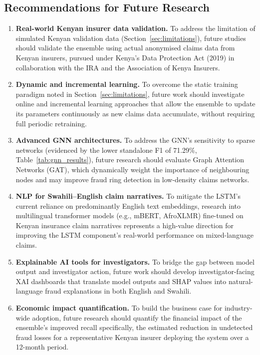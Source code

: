 \documentclass[12pt,a4paper,oneside]{report}
\numberwithin{equation}{chapter}
\begin{document}
\subsection{Recommendations for Future Research}
\label{sec:future-research}

\begin{enumerate}[leftmargin=*, label=\textbf{\arabic*.}]

  \item \textbf{Real-world Kenyan insurer data validation.}
  To address the limitation of simulated Kenyan validation data (Section~\ref{sec:limitations}),
  future studies should validate the ensemble using actual anonymised claims data from Kenyan
  insurers, pursued under Kenya's Data Protection Act (2019) in collaboration with the IRA and
  the Association of Kenya Insurers.

  \item \textbf{Dynamic and incremental learning.}
  To overcome the static training paradigm noted in Section~\ref{sec:limitations}, future work
  should investigate online and incremental learning approaches that allow the ensemble to update
  its parameters continuously as new claims data accumulate, without requiring full periodic
  retraining.

  \item \textbf{Advanced GNN architectures.}
  To address the GNN's sensitivity to sparse networks (evidenced by the lower standalone F1 of
  71.29\%, Table~\ref{tab:gnn_results}), future research should evaluate Graph Attention Networks
  (GAT), which dynamically weight the importance of neighbouring nodes and may improve fraud ring
  detection in low-density claims networks.

  \item \textbf{NLP for Swahili--English claim narratives.}
  To mitigate the LSTM's current reliance on predominantly English text embeddings, research into
  multilingual transformer models (e.g., mBERT, AfroXLMR) fine-tuned on Kenyan insurance claim
  narratives represents a high-value direction for improving the LSTM component's real-world
  performance on mixed-language claims.

  \item \textbf{Explainable AI tools for investigators.}
  To bridge the gap between model output and investigator action, future work should develop
  investigator-facing XAI dashboards that translate model outputs and SHAP values into
  natural-language fraud explanations in both English and Swahili.

  \item \textbf{Economic impact quantification.}
  To build the business case for industry-wide adoption, future research should quantify the
  financial impact of the ensemble's improved recall specifically, the estimated reduction in
  undetected fraud losses for a representative Kenyan insurer deploying the system over a
  12-month period.

\end{enumerate}
\end{document}
